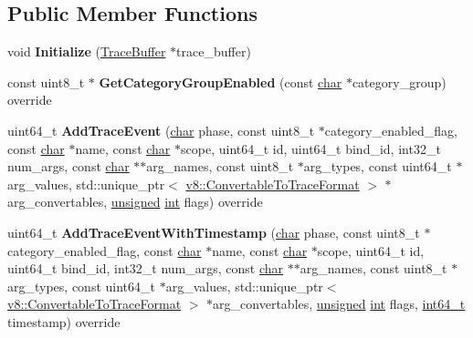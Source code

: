 \subsection*{Public Member Functions}
\begin{DoxyCompactItemize}
\item 
\mbox{\label{classv8_1_1platform_1_1tracing_1_1TracingController_a361ffa698158fbb919c92adf24c1af75}} 
void {\bfseries Initialize} (\mbox{\hyperlink{classv8_1_1platform_1_1tracing_1_1TraceBuffer}{Trace\+Buffer}} $\ast$trace\+\_\+buffer)
\item 
\mbox{\label{classv8_1_1platform_1_1tracing_1_1TracingController_a6201cefe667deb820016248ae0dbb399}} 
const uint8\+\_\+t $\ast$ {\bfseries Get\+Category\+Group\+Enabled} (const \mbox{\hyperlink{classchar}{char}} $\ast$category\+\_\+group) override
\item 
\mbox{\label{classv8_1_1platform_1_1tracing_1_1TracingController_a47338b4633756d96faf31f51b92e7f2e}} 
uint64\+\_\+t {\bfseries Add\+Trace\+Event} (\mbox{\hyperlink{classchar}{char}} phase, const uint8\+\_\+t $\ast$category\+\_\+enabled\+\_\+flag, const \mbox{\hyperlink{classchar}{char}} $\ast$name, const \mbox{\hyperlink{classchar}{char}} $\ast$scope, uint64\+\_\+t id, uint64\+\_\+t bind\+\_\+id, int32\+\_\+t num\+\_\+args, const \mbox{\hyperlink{classchar}{char}} $\ast$$\ast$arg\+\_\+names, const uint8\+\_\+t $\ast$arg\+\_\+types, const uint64\+\_\+t $\ast$arg\+\_\+values, std\+::unique\+\_\+ptr$<$ \mbox{\hyperlink{classv8_1_1ConvertableToTraceFormat}{v8\+::\+Convertable\+To\+Trace\+Format}} $>$ $\ast$arg\+\_\+convertables, \mbox{\hyperlink{classunsigned}{unsigned}} \mbox{\hyperlink{classint}{int}} flags) override
\item 
\mbox{\label{classv8_1_1platform_1_1tracing_1_1TracingController_afe55e970fb86427e59fb58c6b60fea80}} 
uint64\+\_\+t {\bfseries Add\+Trace\+Event\+With\+Timestamp} (\mbox{\hyperlink{classchar}{char}} phase, const uint8\+\_\+t $\ast$category\+\_\+enabled\+\_\+flag, const \mbox{\hyperlink{classchar}{char}} $\ast$name, const \mbox{\hyperlink{classchar}{char}} $\ast$scope, uint64\+\_\+t id, uint64\+\_\+t bind\+\_\+id, int32\+\_\+t num\+\_\+args, const \mbox{\hyperlink{classchar}{char}} $\ast$$\ast$arg\+\_\+names, const uint8\+\_\+t $\ast$arg\+\_\+types, const uint64\+\_\+t $\ast$arg\+\_\+values, std\+::unique\+\_\+ptr$<$ \mbox{\hyperlink{classv8_1_1ConvertableToTraceFormat}{v8\+::\+Convertable\+To\+Trace\+Format}} $>$ $\ast$arg\+\_\+convertables, \mbox{\hyperlink{classunsigned}{unsigned}} \mbox{\hyperlink{classint}{int}} flags, \mbox{\hyperlink{classint64__t}{int64\+\_\+t}} timestamp) override

\end{DoxyCompactItemize}
